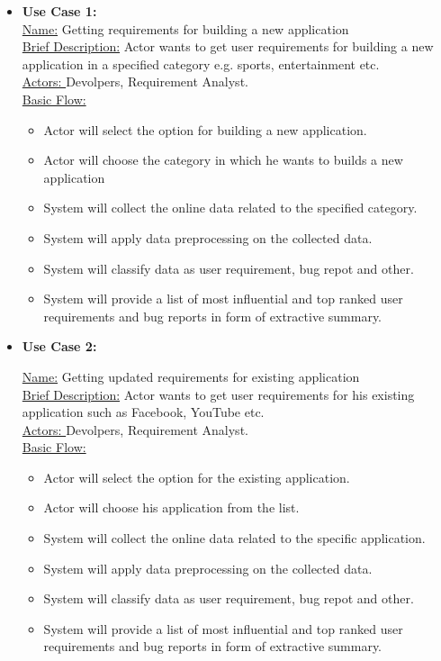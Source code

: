 \begin{itemize}
\item{\textbf{Use Case 1:\\}}
 \underline {Name:} Getting requirements for building a new application\\
 \underline{Brief Description:} Actor wants to get user requirements for building a new application in a specified category e.g. sports, entertainment etc.\\
 \underline{Actors: } Devolpers, Requirement Analyst.\\
 \underline{Basic Flow:}
\begin {itemize}
\item{Actor will select the option for building a new application.}
\item{Actor will choose the category in which he wants to builds a new application}
\item{System will collect the online data related to the specified category.}
\item{System will apply data preprocessing on the collected data.}
\item{System will classify data as user requirement, bug repot and other.}
\item{System will provide a list of most influential and top ranked user requirements and bug reports in form of extractive summary.\\}
\end{itemize}
\item{\textbf{Use Case 2:\\}}

 \underline{Name:} Getting updated requirements for existing application\\
 \underline{Brief Description:} Actor wants to get user requirements for his existing application such as Facebook, YouTube etc.\\
 \underline{Actors: } Devolpers, Requirement Analyst.\\
 \underline{Basic Flow:}
\begin {itemize}
\item{Actor will select the option for the existing application.}
\item{Actor will choose his application from the list.}
\item{System will collect the online data related to the specific application. }
\item{System will apply data preprocessing on the collected data.}
\item{System will classify data as user requirement, bug repot and other.}
\item{System will provide a list of most influential and top ranked user requirements and bug reports in form of extractive summary.\\}
\end{itemize}


\end{itemize}
